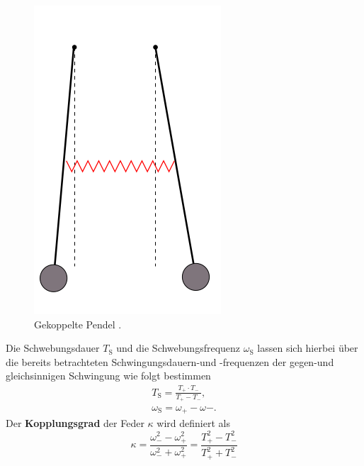 \begin{figure}
	\centering
	\includegraphics[width=0.4\linewidth]{Bilder/gekoppelt.png}
	\caption{Gekoppelte Pendel \cite{Anleitung}.}
	\label{fig:schwebe}

\end{figure}
\FloatBarrier
Die Schwebungsdauer $T_{\mathrm{S}}$ und die Schwebungsfrequenz $\omega_{\mathrm{S}}$ lassen sich hierbei über die bereits betrachteten Schwingungsdauern-und -frequenzen der gegen-und gleichsinnigen Schwingung wie folgt bestimmen
\begin{gather}
	T_{\mathrm{S}}=\frac{T_{\mathrm{+}}\cdot T_{\mathrm{-}}}{T_{\mathrm{+}}-T_{\mathrm{-}}} \text{,}\\
	\omega_{\mathrm{S}}=\omega_{\mathrm{+}}-\omega{\mathrm{-}} \text{.}
\end{gather}
Der \textbf{Kopplungsgrad} der Feder $\kappa$ wird definiert als
\begin{equation}
	\kappa=\frac{\omega_{\mathrm{-}}^2-\omega_{\mathrm{+}}^2}{\omega_{\mathrm{-}}^2+\omega_{\mathrm{+}}^2}=\frac{T_{\mathrm{+}}^2-T_{\mathrm{-}}^2}{T_{\mathrm{+}}^2+T_{\mathrm{-}}^2}
\end{equation}
